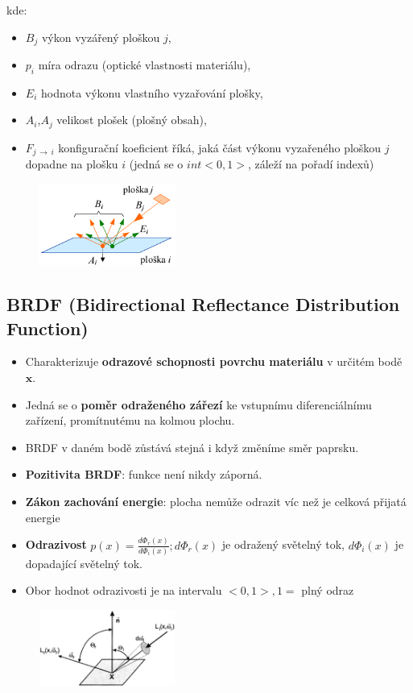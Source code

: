 kde: 
\begin{itemize}
\item[] $B_j$ výkon vyzářený ploškou $j$,
\item[] $p_i$ míra odrazu (optické vlastnosti materiálu),
\item[] $E_i$ hodnota výkonu vlastního vyzařování plošky,
\item[] $A_i$,$A_j$ velikost plošek (plošný obsah),
\item[] $F_{j \,\to\, i}$ konfigurační koeficient říká, jaká část výkonu vyzařeného ploškou $j$ dopadne na plošku $i$ (jedná se o $int <0,1>$, záleží na pořadí indexů)
\end{itemize}
\begin{figure}[H]
\centering
\includegraphics[width=0.4\textwidth]{assets/6_vyzarovaci_metoda}
\end{figure}

\subsection{BRDF (Bidirectional Reflectance Distribution Function)}
\begin{itemize}
	\item Charakterizuje \textbf{odrazové schopnosti povrchu materiálu} v určitém bodě $\mathbf{x}$.
	\item Jedná se o \textbf{poměr odraženého zářezí} ke vstupnímu diferenciálnímu zařízení, promítnutému na kolmou plochu.
	\item BRDF v daném bodě zůstává stejná i když změníme směr paprsku.
	\item \textbf{Pozitivita BRDF}: funkce není nikdy záporná.
	\item \textbf{Zákon zachování energie}: plocha nemůže odrazit víc než je celková přijatá energie
	\item \textbf{Odrazivost} $p(x) = \frac{d\Phi_r(x)}{d\Phi_i(x)}; d\Phi_r(x)$ je odražený světelný tok, $d\Phi_i(x)$ je dopadající světelný tok.
	\item Obor hodnot odrazivosti je na intervalu $<0,1>, 1=$ plný odraz 
\end{itemize}
\begin{figure}[H]
\centering
\includegraphics[width=0.4\textwidth]{assets/6_brdf}
\end{figure}
